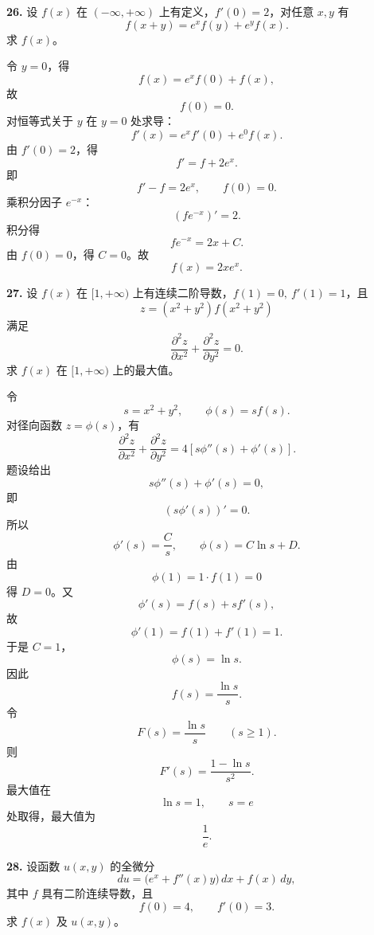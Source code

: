 \begin{problemblock}
\textbf{26.} 设 \(f(x)\) 在 \((-\infty,+\infty)\) 上有定义，\(f'(0)=2\)，对任意 \(x,y\) 有
\[
f(x+y)=e^x f(y)+e^y f(x).
\]
求 \(f(x)\)。
\end{problemblock}

\begin{solutionblock}
令 \(y=0\)，得
\[
f(x)=e^x f(0)+f(x),
\]
故
\[
f(0)=0.
\]
对恒等式关于 \(y\) 在 \(y=0\) 处求导：
\[
f'(x)=e^x f'(0)+e^0 f(x).
\]
由 \(f'(0)=2\)，得
\[
f'=f+2e^x.
\]
即
\[
f'-f=2e^x,\qquad f(0)=0.
\]
乘积分因子 \(e^{-x}\)：
\[
(fe^{-x})'=2.
\]
积分得
\[
fe^{-x}=2x+C.
\]
由 \(f(0)=0\)，得 \(C=0\)。故
\[
\boxed{f(x)=2xe^x}.
\]
\end{solutionblock}

\begin{problemblock}
\textbf{27.} 设 \(f(x)\) 在 \([1,+\infty)\) 上有连续二阶导数，\(f(1)=0,\ f'(1)=1\)，且
\[
z=(x^2+y^2)f(x^2+y^2)
\]
满足
\[
\frac{\partial^2z}{\partial x^2}+\frac{\partial^2z}{\partial y^2}=0.
\]
求 \(f(x)\) 在 \([1,+\infty)\) 上的最大值。
\end{problemblock}

\begin{solutionblock}
令
\[
s=x^2+y^2,\qquad \phi(s)=sf(s).
\]
对径向函数 \(z=\phi(s)\)，有
\[
\frac{\partial^2z}{\partial x^2}+\frac{\partial^2z}{\partial y^2}
=4[s\phi''(s)+\phi'(s)].
\]
题设给出
\[
s\phi''(s)+\phi'(s)=0,
\]
即
\[
(s\phi'(s))'=0.
\]
所以
\[
\phi'(s)=\frac{C}{s},
\qquad
\phi(s)=C\ln s+D.
\]
由
\[
\phi(1)=1\cdot f(1)=0
\]
得 \(D=0\)。又
\[
\phi'(s)=f(s)+sf'(s),
\]
故
\[
\phi'(1)=f(1)+f'(1)=1.
\]
于是 \(C=1\)，
\[
\phi(s)=\ln s.
\]
因此
\[
f(s)=\frac{\ln s}{s}.
\]
令
\[
F(s)=\frac{\ln s}{s}\qquad(s\ge1).
\]
则
\[
F'(s)=\frac{1-\ln s}{s^2}.
\]
最大值在
\[
\ln s=1,\qquad s=e
\]
处取得，最大值为
\[
\boxed{\frac1e}.
\]
\end{solutionblock}

\begin{problemblock}
\textbf{28.} 设函数 \(u(x,y)\) 的全微分
\[
du=\bigl(e^x+f''(x)y\bigr)\,dx+f(x)\,dy,
\]
其中 \(f\) 具有二阶连续导数，且
\[
f(0)=4,\qquad f'(0)=3.
\]
求 \(f(x)\) 及 \(u(x,y)\)。
\end{problemblock}

